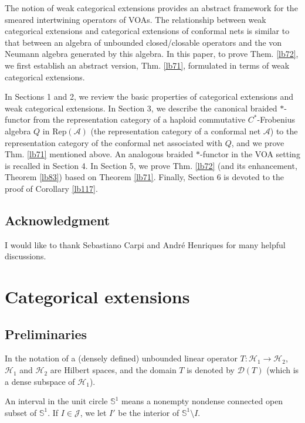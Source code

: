 \documentclass[11pt,b5paper,notitlepage]{article}
\theoremstyle{definition}
\theoremstyle{plain}
\newcommand{\mc}{\mathcal}
\newcommand{\Rep}{\mathrm{Rep}}
\newcommand{\Dom}{\scr D}
\newcommand{\scr}{\mathscr}
\newcommand{\Sbb}{{\mathbb S}}
\numberwithin{equation}{section}
\begin{document}
The notion of weak categorical extensions provides an abstract framework for the smeared intertwining operators of VOAs. The relationship between weak categorical extensions and categorical extensions of conformal nets is similar to that between an algebra of unbounded closed/closable operators and the von Neumann algebra generated by this algebra. In this paper, to prove Them. \ref{lb72}, we first establish an abstract version, Thm. \ref{lb71}, formulated in terms of weak categorical extensions.





In Sections 1 and 2, we review the basic properties of categorical extensions and weak categorical extensions. In Section 3, we describe the canonical braided $*$-functor from the representation category of a haploid commutative $C^*$-Frobenius algebra $Q$ in $\Rep(\mc A)$ (the representation category of a conformal net $\mc A$) to the representation category of the conformal net associated with $Q$, and we prove Thm. \ref{lb71} mentioned above. An analogous braided $*$-functor in the VOA setting is recalled in Section 4. In Section 5, we prove Thm. \ref{lb72} (and its enhancement, Theorem \ref{lb83}) based on Theorem \ref{lb71}. Finally, Section 6 is devoted to the proof of Corollary \ref{lb117}.



\subsection*{Acknowledgment}

I would like to thank Sebastiano Carpi and Andr\'e Henriques for many helpful discussions.




\section{Categorical extensions}\label{lb5}


\subsection{Preliminaries}\label{lb18}

In the notation of a (densely defined) unbounded linear operator $T:\mc H_1\rightarrow\mc H_2$, $\mc H_1$ and $\mc H_2$ are Hilbert spaces, and the domain $T$ is denoted by $\Dom(T)$ (which is a dense subspace of $\mc H_1$).

An interval in the unit circle $\Sbb^1$ means a nonempty nondense connected open subset of $\Sbb^1$. If $I\in\mc J$, we let $I'$ be the interior of $\Sbb^1\setminus I$.
\end{document}
